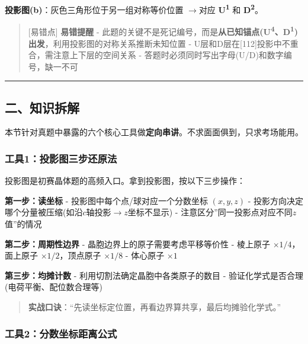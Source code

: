 \documentclass[a4paper,11pt]{ctexart}
\newcommand{\箭}{\ensuremath{\rightarrow}}
\newcommand{\左箭}{\ensuremath{\leftarrow}}
\newcommand{\上箭}{\ensuremath{\uparrow}}
\newcommand{\下箭}{\ensuremath{\downarrow}}
\newcommand{\衡}{\ensuremath{\rightleftharpoons}}
\newcommand{\双箭}{\ensuremath{\leftrightarrow}}
\newcommand{\约等于}{\ensuremath{\approx}}
\newcommand{\小于等于}{\ensuremath{\leq}}
\newcommand{\大于等于}{\ensuremath{\geq}}
\newcommand{\不等于}{\ensuremath{\neq}}
\newcommand{\西格马}{\ensuremath{\sigma}}
\newcommand{\派}{\ensuremath{\pi}}
\begin{document}
\textbf{投影图(b)}：灰色三角形位于另一组对称等价位置 \箭 对应 \textbf{U\textsuperscript{1}} 和 \textbf{D\textsuperscript{2}}。

\begin{quote}
{[}易错点{]} \textbf{易错提醒}
- 此题的关键不是死记编号，而是\textbf{从已知锚点(U\textsuperscript{4}、D\textsuperscript{1})出发}，利用投影图的对称关系推断未知位置
- U层和D层在{[}112{]}投影中不重合，需注意上下层的空间关系
- 答题时必须同时写出字母(U/D)和数字编号，缺一不可
\end{quote}

\begin{center}\rule{0.5\linewidth}{0.5pt}\end{center}

\subsection{二、知识拆解}\label{ux4e8cux77e5ux8bc6ux62c6ux89e3-3}

本节针对真题中暴露的六个核心工具做\textbf{定向串讲}。不求面面俱到，只求考场能用。

\subsubsection{工具1：投影图三步还原法}\label{ux5de5ux51771ux6295ux5f71ux56feux4e09ux6b65ux8fd8ux539fux6cd5}

投影图是初赛晶体题的高频入口。拿到投影图，按以下三步操作：

\textbf{第一步：读坐标}
- 投影图中每个点/球对应一个分数坐标 \((x, y, z)\)
- 投影方向决定哪个分量被压缩(如沿\(c\)轴投影\箭\(z\)坐标不显示)
- 注意区分''同一投影点对应不同\(z\)值''的情况

\textbf{第二步：周期性边界}
- 晶胞边界上的原子需要考虑平移等价性
- 棱上原子 \(\times 1/4\)，面上原子 \(\times 1/2\)，顶点原子 \(\times 1/8\)
- 体心原子 \(\times 1\)

\textbf{第三步：均摊计数}
- 利用切割法确定晶胞中各类原子的数目
- 验证化学式是否合理(电荷平衡、配位数合理等)

\begin{quote}
\textbf{实战口诀}：``先读坐标定位置，再看边界算共享，最后均摊验化学式。''
\end{quote}

\subsubsection{工具2：分数坐标距离公式}\label{ux5de5ux51772ux5206ux6570ux5750ux6807ux8dddux79bbux516cux5f0f}
\end{document}
